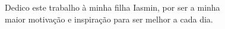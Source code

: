 
\chapter*{}
\vspace{15cm}
\begin{flushright}
Dedico este trabalho à minha filha Iasmin, por ser a minha\\
maior motivação e inspiração para ser melhor a cada dia.
\end{flushright}
